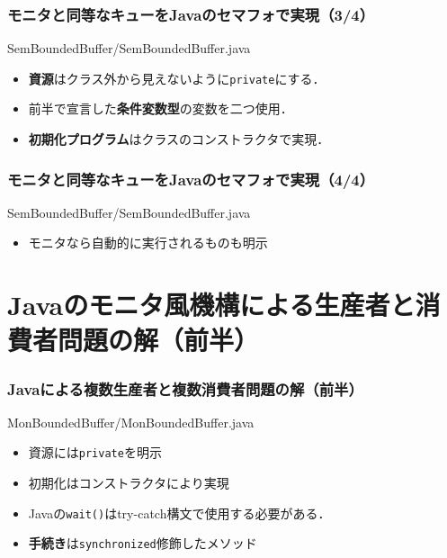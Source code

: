 \documentclass[unicode,handout]{beamer}                   %
\begin{document}
\begin{frame}
  \frametitle{モニタと同等なキューをJavaのセマフォで実現（3/4）}
      {SemBoundedBuffer/SemBoundedBuffer.java}

  \begin{itemize}
  \item {\bf 資源}はクラス外から見えないように{\tt private}にする．
  \item 前半で宣言した{\bf 条件変数型}の変数を二つ使用．
  \item {\bf 初期化プログラム}はクラスのコンストラクタで実現．
  \end{itemize}
\end{frame}

\begin{frame}
  \frametitle{モニタと同等なキューをJavaのセマフォで実現（4/4）}
      {SemBoundedBuffer/SemBoundedBuffer.java}

  \begin{itemize}
  \item モニタなら自動的に実行されるものも明示
  \end{itemize}
\end{frame}

\fi

\section{Javaのモニタ風機構による生産者と消費者問題の解（前半）}
\begin{frame}
  \frametitle{Javaによる複数生産者と複数消費者問題の解（前半）}
      {MonBoundedBuffer/MonBoundedBuffer.java}

  \begin{itemize}
  \item 資源には{\tt private}を明示
  \item 初期化はコンストラクタにより実現
  \item Javaの{\tt wait()}はtry-catch構文で使用する必要がある．
  \item {\bf 手続き}は{\tt synchronized}修飾したメソッド
  \end{itemize}
\end{frame}
\end{document}
